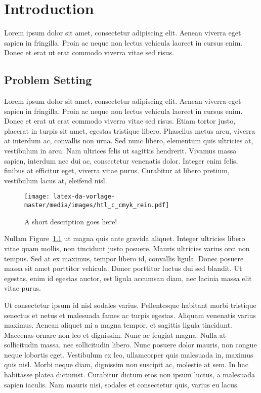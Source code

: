 
\chapter{Introduction}

Lorem ipsum dolor sit amet, consectetur adipiscing elit. Aenean viverra eget sapien in fringilla. Proin ac neque non lectus vehicula laoreet in cursus enim. Donec et erat ut erat commodo viverra vitae sed risus.

\section{Problem Setting}

Lorem ipsum dolor sit amet, consectetur adipiscing elit. Aenean viverra eget sapien in fringilla. Proin ac neque non lectus vehicula laoreet in cursus enim. Donec et erat ut erat commodo viverra vitae sed risus. Etiam tortor justo, placerat in turpis sit amet, egestas tristique libero. Phasellus metus arcu, viverra at interdum ac, convallis non urna. Sed nunc libero, elementum quis ultricies at, vestibulum in arcu. Nam ultrices felis ut sagittis hendrerit. Vivamus massa sapien, interdum nec dui ac, consectetur venenatis dolor. Integer enim felis, finibus at efficitur eget, viverra vitae purus. Curabitur at libero pretium, vestibulum lacus at, eleifend nisl.

\begin{figure}[tb]
\centering
  \begin{center}
    \texttt{[image: latex-da-vorlage-master/media/images/htl\_c\_cmyk\_rein.pdf]}
  \end{center}
\caption{A short description goes here!}
\label{figure_label}
\end{figure}

Nullam Figure~\ref{figure_label} ut magna quis ante gravida aliquet. Integer ultricies libero vitae quam mollis, non tincidunt justo posuere. Mauris ultricies varius orci non tempus. Sed at ex maximus, tempor libero id, convallis ligula. Donec posuere massa sit amet porttitor vehicula. Donec porttitor luctus dui sed blandit. Ut egestas, enim id egestas auctor, est ligula accumsan diam, nec lacinia massa elit vitae purus.

Ut consectetur ipsum id nisl sodales varius. Pellentesque habitant morbi tristique senectus et netus et malesuada fames ac turpis egestas. Aliquam venenatis varius maximus. Aenean aliquet mi a magna tempor, et sagittis ligula tincidunt. Maecenas ornare non leo et dignissim. Nunc ac feugiat magna. Nulla at sollicitudin massa, nec sollicitudin libero. Nunc posuere dolor mauris, non congue neque lobortis eget. Vestibulum ex leo, ullamcorper quis malesuada in, maximus quis nisl. Morbi neque diam, dignissim non suscipit ac, molestie at sem. In hac habitasse platea dictumst. Curabitur dictum eros non ipsum luctus, a malesuada sapien iaculis. Nam mauris nisi, sodales et consectetur quis, varius eu lacus.


